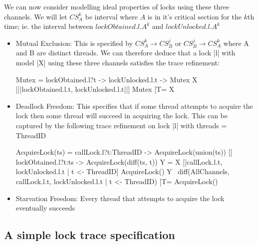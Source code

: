 We can now consider modelling ideal properties of locks using these three channels. We will let $CS^{k}_{A}$ be interval where $A$ is in it's critical section for the $k$th time; ie. the interval between $lockObtained.l.A^{k}$ and $lockUnlocked.l.A^{k}$
\begin{itemize}
  \item Mutual Exclusion: This is specified by $CS^{k}_{A} \rightarrow CS^{j}_{B}$ or $CS^{j}_{B} \rightarrow CS^{k}_{A}$ where A and B are distinct threads. We can therefore deduce that a lock |l| with model |X| using these three channels satisfies the trace refinement:  
  \begin{cspm}
    Mutex = lockObtained.l?t -> lockUnlocked.l.t -> Mutex
    X [|{|lockObtained.l.t, lockUnlocked.l.t|}|] Mutex [T= X\end{cspm}

  \item Deadlock Freedom: This specifies that if some thread attempts to acquire the lock then some thread will succeed in acquiring the lock. This can be captured by the following trace refinement on lock |l| with threads = ThreadID
  \begin{cspm}
    AcquireLock(ts) = callLock.l?t:{ThreadID\ts} -> AcquireLock(union(ts))
    []  lockObtained.l?t:ts -> AcquireLock(diff(ts, {t}))
    Y = X [|{callLock.l.t, lockUnlocked.l.t | t <- ThreadID}] AcquireLock({})
    Y \ diff(AllChannels, {callLock.l.t, lockUnlocked.l.t | t <- ThreadID}) [T= AcquireLock({})
  \end{cspm}
  \item Starvation Freedom: Every thread that attempts to acquire the lock eventually succeeds
  
\end{itemize}

\subsection{A simple lock trace specification}

